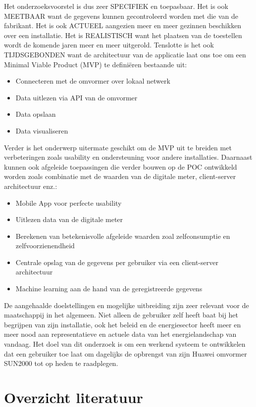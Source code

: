 \documentclass{hogent-article}
\begin{document}
    Het onderzoeksvoorstel is dus zeer SPECIFIEK en toepasbaar. Het is ook MEETBAAR want de gegevens kunnen gecontroleerd worden met die van de fabrikant. Het is ook ACTUEEL aangezien meer en meer gezinnen beschikken over een installatie. Het is REALISTISCH want het plaatsen van de toestellen wordt de komende jaren meer en meer uitgerold. Tenslotte is het ook TIJDSGEBONDEN want de architectuur van de applicatie laat ons toe om een Minimal Viable Product (MVP) te definiëren bestaande uit:
    \begin{itemize}
        \item Connecteren met de omvormer over lokaal netwerk
        \item Data uitlezen via API van de omvormer
        \item Data opslaan
        \item Data visualiseren
    \end{itemize}
    Verder is het onderwerp uitermate geschikt om de MVP uit te breiden met verbeteringen zoals usability en ondersteuning voor andere installaties. Daarnaast kunnen ook afgeleide toepassingen die verder bouwen op de POC ontwikkeld worden zoals combinatie met de waarden van de digitale meter, client-server architectuur enz.:
    \begin{itemize}
        \item Mobile App voor perfecte usability
        \item Uitlezen data van de digitale meter
        \item Berekenen van betekenisvolle afgeleide waarden zoal zelfconsumptie en zelfvoorzienendheid
        \item Centrale opslag van de gegevens per gebruiker via een client-server architectuur
        \item Machine learning aan de hand van de geregistreerde gegevens
    \end{itemize}
    De aangehaalde doelstellingen en mogelijke uitbreiding zijn zeer relevant voor de maatschappij in het algemeen. Niet alleen de gebruiker zelf heeft baat bij het begrijpen van zijn installatie, ook het beleid en de energiesector heeft meer en meer nood aan representatieve en actuele data van het energielandschap van vandaag.\newline
    Het doel van dit onderzoek is om een werkend systeem te ontwikkelen dat een gebruiker toe laat om dagelijks de opbrengst van zijn Huawei omvormer SUN2000 tot op heden te raadplegen. 
    
    \section{Overzicht literatuur}
    
\end{document}
